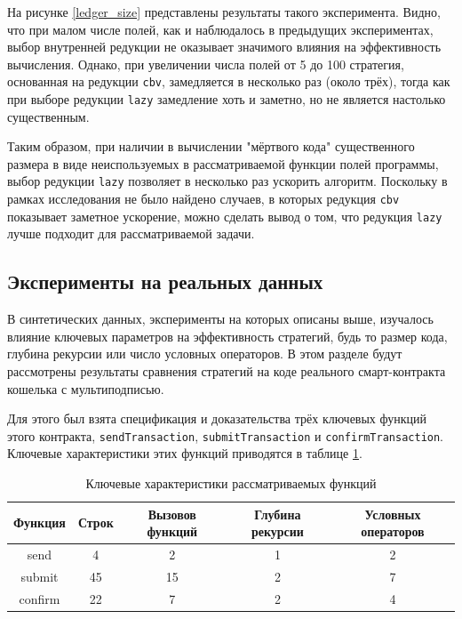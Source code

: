 \documentclass[../thesis.tex]{subfiles}
\begin{document}
На рисунке \ref{ledger_size} представлены результаты такого эксперимента. Видно, что при малом числе полей, как и наблюдалось в предыдущих экспериментах, выбор внутренней редукции не оказывает значимого влияния на эффективность вычисления. Однако, при увеличении числа полей от 5 до 100 стратегия, основанная на редукции \texttt{cbv}, замедляется в несколько раз (около трёх), тогда как при выборе редукции \texttt{lazy} замедление хоть и заметно, но не является настолько существенным. 

Таким образом, при наличии в вычислении "мёртвого кода" существенного размера в виде неиспользуемых в рассматриваемой функции полей программы, выбор редукции \texttt{lazy} позволяет в несколько раз ускорить алгоритм. Поскольку в рамках исследования не было найдено случаев, в которых редукция \texttt{cbv} показывает заметное ускорение, можно сделать вывод о том, что редукция \texttt{lazy} лучше подходит для рассматриваемой задачи. 

\subsection{Эксперименты на реальных данных}

В синтетических данных, эксперименты на которых описаны выше, изучалось влияние ключевых параметров на эффективность стратегий, будь то размер кода, глубина рекурсии или число условных операторов. В этом разделе будут рассмотрены результаты сравнения стратегий на коде реального смарт-контракта кошелька с мультиподписью.

Для этого был взята спецификация и доказательства трёх ключевых функций этого контракта, \texttt{sendTransaction}, \texttt{submitTransaction} и \texttt{confirmTransaction}. Ключевые характеристики этих функций приводятся в таблице \ref{multisig_analysis}.

\begin{table}[h]
\centering
\begin{tabular}{|c|c|c|c|c|}
\hline
Функция & Строк & Вызовов функций & Глубина рекурсии & Условных операторов \\
\hline
send & 4 & 2 & 1 & 2 \\
\hline
submit & 45 & 15 & 2 & 7\\
\hline
confirm & 22 & 7 & 2 & 4 \\
\hline
\end{tabular}
\caption{Ключевые характеристики рассматриваемых функций}
\label{multisig_analysis}
\end{table}
\end{document}
